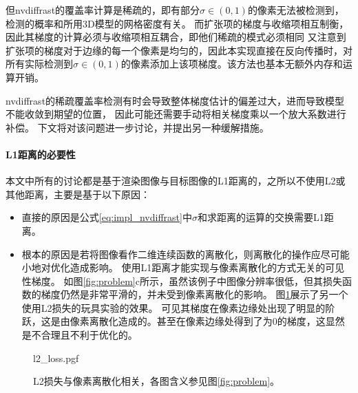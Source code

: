 但nvdiffrast的覆盖率计算是稀疏的，即有部分$\sigma\in(0,1)$的像素无法被检测到，检测的概率和所用3D模型的网格密度有关。
而扩张项的梯度与收缩项相互制衡，因此其梯度的计算必须与收缩项相互耦合，即他们稀疏的模式必须相同
又注意到扩张项的梯度对于边缘的每一个像素是均匀的，因此本实现直接在反向传播时，对所有实际检测到$\sigma\in(0,1)$的像素添加上该项梯度。该方法也基本无额外内存和运算开销。

nvdiffrast的稀疏覆盖率检测有时会导致整体梯度估计的偏差过大，进而导致模型不能收敛到期望的位置，
因此可能还需要手动将相关梯度乘以一个放大系数进行补偿。
下文将对该问题进一步讨论，并提出另一种缓解措施。

\paragraph{L1距离的必要性}
本文中所有的讨论都是基于渲染图像与目标图像的L1距离的，之所以不使用L2或其他距离，主要是基于以下原因：
\begin{itemize}
\item 直接的原因是公式\ref{eq:impl_nvdiffrast}中$\sigma$和求距离的运算的交换需要L1距离。
\item 根本的原因是若将图像看作二维连续函数的离散化，则离散化的操作应尽可能小地对优化造成影响。
使用L1距离才能实现与像素离散化的方式无关的可见性梯度。
如图\ref{fig:problem}c所示，虽然该例子中图像分辨率很低，但其损失函数的梯度仍然是非常平滑的，并未受到像素离散化的影响。
图\ref{fig:l2_loss}展示了另一个使用L2损失的玩具实验的效果。
可见其梯度在像素边缘处出现了明显的阶跃，这是由像素离散化造成的。甚至在像素边缘处得到了为0的梯度，这显然是不合理且不利于优化的。
\end{itemize}

\begin{figure}
    \centering
    {l2_loss.pgf}
    \caption[L2损失与像素离散化相关]{L2损失与像素离散化相关，各图含义参见图\ref{fig:problem}。}
    \label{fig:l2_loss}
\end{figure}

